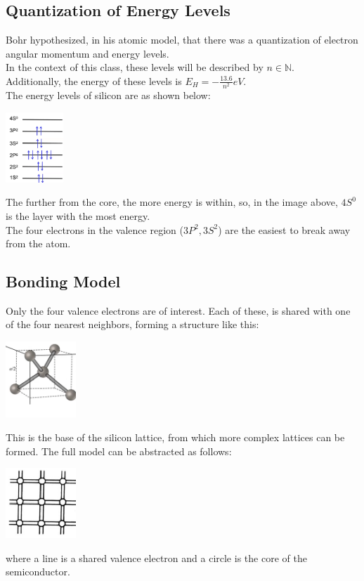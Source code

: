 \documentclass[nobib]{tufte-handout}
\begin{document}
\subsection{Quantization of Energy Levels}
Bohr hypothesized, in his atomic model, that there was a quantization of electron angular momentum and energy levels.\\
In the context of this class, these levels will be described by $n \in \mathbb{N}$.\\
Additionally, the energy of these levels is $E_H = -\frac{13.6}{n^2}eV$.\\
The energy levels of silicon are as shown below:\\
\begin{center}
    \includegraphics*[height = 100px]{images/si_energy_levels.png}
\end{center}
The further from the core, the more energy is within, so, in the image above, $4S^0$ is the layer with the most energy.\\
The four electrons in the valence region ($3P^2,3S^2$) are the easiest to break away from the atom.
\subsection{Bonding Model}
Only the four valence electrons are of interest. Each of these, is shared with one of the four nearest neighbors, forming a structure like this:
\begin{center}
    \includegraphics*[width = 100px]{images/silicon_neighbor_bond.png}
\end{center}
This is the base of the silicon lattice, from which more complex lattices can be formed. The full model can be abstracted as follows:
\begin{center}
    \includegraphics*[width = 100px]{images/bonding_model.png}
\end{center}
where a line is a shared valence electron and a circle is the core of the semiconductor.\\
\end{document}
